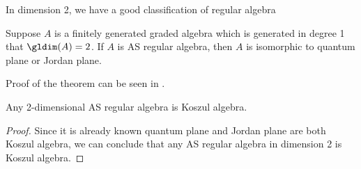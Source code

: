 In dimension 2, we have a good classification of regular algebra
\begin{thm}
Suppose $A$ is a finitely generated graded algebra which is generated in degree 1 that $\gldim(A)=2$. If $A$ is AS regular algebra, then $A$ is isomorphic to quantum plane or Jordan plane.
\end{thm}
Proof of the theorem can be seen in \cite[ref][]{Roga2014}.
\begin{cor}
Any 2-dimensional AS regular algebra is Koszul algebra.
\end{cor}
\begin{proof}
Since it is already known quantum plane and Jordan plane are both Koszul algebra, we can conclude that any AS regular algebra in dimension 2 is Koszul algebra. 
\end{proof}
